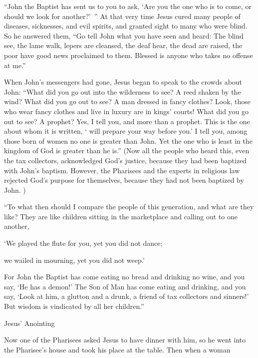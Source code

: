 {“John
the Baptist
has sent
us
to
you
to ask, ‘Are
you
the one who is
to come,
or
should we look for
another?’ ”
At
that
very time
Jesus cured
many people
of
diseases,
sicknesses,
and
evil
spirits,
and
granted
sight
to many
who were blind.
So
he answered
them, “Go
tell
John
what
you have seen
and
heard: The blind
see,
the lame
walk,
lepers
are cleansed,
the deaf
hear,
the dead
are raised,
the poor
have good news proclaimed to them.
Blessed
is
anyone
who
takes
no
offense
at
me.”
\par }{\PP {}When
John’s
messengers
had gone,
Jesus began
to speak
to
the crowds
about
John: “What
did you go out
into
the wilderness
to see? A reed
shaken
by
the wind?
What
did you go out
to see? A man
dressed
in
fancy clothes? Look,
those who wear fancy clothes
and
live
in luxury
are
in
kings’ courts!
What
did you go out
to see? A prophet? Yes,
I tell
you,
and
more than
a prophet.
This
is
the one about
whom
it is written, ‘{}
{}
will prepare
your
way
before
you.’
I tell
you,
among
those born
of women
no
one is
greater than
John.
Yet the one who is least
in
the kingdom
of God
is
greater than
he is.”
(Now
all
the people
who heard
this, even
the tax collectors,
acknowledged
God’s
justice,
because they had been baptized
with John’s
baptism.
However,
the Pharisees
and
the experts in religious law
rejected
God’s
purpose
for
themselves,
because they had
not
been baptized
by
John. )
\par }{\PP {}“To what
then
should I compare
the people
of this
generation,
and
what
are they
like?
They are
like
children
sitting
in
the marketplace
and
calling out
to one another,
\par }{\Q ‘We played the flute
for you,
yet
you did
not
dance;
\par }{\Q we wailed in mourning,
yet
you did
not
weep.’
\par }{\PI {}For
John
the Baptist
has come
eating
no
bread
and
drinking
no
wine,
and
you say,
‘He has
a demon!’
The Son
of Man
has come
eating
and
drinking,
and
you say,
‘Look
at him,
a glutton
and
a drunk,
a friend
of tax collectors
and
sinners!’
But
wisdom
is vindicated
by
all
her
children.”
\par }{\SH Jesus’ Anointing
\par }{\PP {}Now one of the Pharisees
asked
Jesus
to
have dinner
with
him,
so
he went
into
the Pharisee’s
house
and took
his place at the table.
Then
when a woman
}
